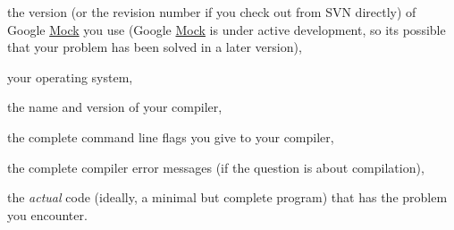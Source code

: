 \begin{DoxyItemize}
\item the version (or the revision number if you check out from S\+VN directly) of Google \hyperlink{classMock}{Mock} you use (Google \hyperlink{classMock}{Mock} is under active development, so it\textquotesingle{}s possible that your problem has been solved in a later version),
\item your operating system,
\item the name and version of your compiler,
\item the complete command line flags you give to your compiler,
\item the complete compiler error messages (if the question is about compilation),
\item the {\itshape actual} code (ideally, a minimal but complete program) that has the problem you encounter. 
\end{DoxyItemize}